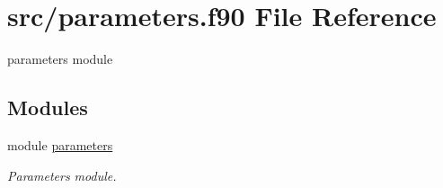 \hypertarget{parameters_8f90}{}\section{src/parameters.f90 File Reference}
\label{parameters_8f90}


parameters module  


\subsection*{Modules}
\begin{DoxyCompactItemize}
\item 
module \hyperlink{namespaceparameters}{parameters}
\begin{DoxyCompactList}\small\item\em Parameters module. \end{DoxyCompactList}\end{DoxyCompactItemize}
